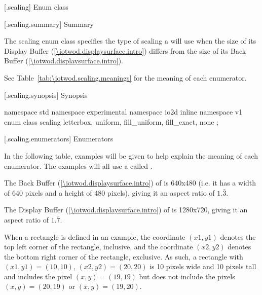  [\iotwod.scaling] {Enum class }

 [\iotwod.scaling.summary] { Summary}

\pnum
The scaling enum class specifies the type of scaling a  
will use when the size of its Display Buffer (\ref{\iotwod.displaysurface.intro}) differs from the size of its Back Buffer (\ref{\iotwod.displaysurface.intro}).

\pnum
See Table~\ref{tab:\iotwod.scaling.meanings} for the meaning of each  enumerator.

 [\iotwod.scaling.synopsis] { Synopsis}

\begin{codeblock}
namespace std { namespace experimental { namespace io2d { inline namespace v1 {
  enum class scaling {
    letterbox,
    uniform,
    fill_uniform,
    fill_exact,
    none
  };
} } } }
\end{codeblock}

 [\iotwod.scaling.enumerators] { Enumerators}

\pnum
\begin{note}
In the following table, examples will be given to help explain the meaning of each enumerator. The examples will all use a  called .

The Back Buffer (\ref{\iotwod.displaysurface.intro}) of  is 640x480 (i.e. it has a width of 640 pixels and a height of 480 pixels), giving it an aspect ratio of $1.\bar{3}$.

The Display Buffer (\ref{\iotwod.displaysurface.intro}) of  is 1280x720, giving it an aspect ratio of $1.\bar{7}$.

When a rectangle is defined in an example, the coordinate $(x1,y1)$ denotes the top left corner of the rectangle, inclusive, and the coordinate $(x2,y2)$ denotes the bottom right corner of the rectangle, exclusive. As such, a rectangle with $(x1,y1) = (10,10)$, $(x2,y2) = (20, 20)$ is 10 pixels wide and 10 pixels tall and includes the pixel $(x,y) = (19,19)$ but does not include the pixels $(x,y) = (20,19)$ or $(x,y) = (19,20)$.
\end{note}

